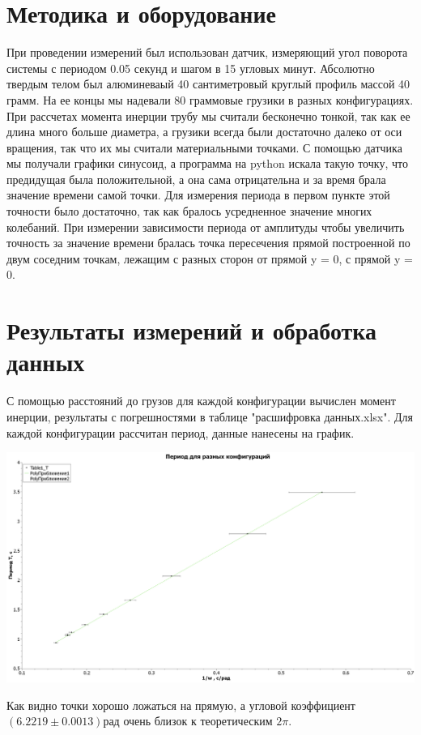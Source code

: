 \documentclass[12pt,a4paper]{scrartcl}
\begin{document}
\section{Методика и оборудование}
	При проведении измерений был использован датчик, измеряющий угол поворота системы с периодом 0.05 секунд и шагом в 15 угловых минут. Абсолютно твердым телом был алюминеваый 40 сантиметровый круглый профиль массой 40 грамм. На ее концы мы надевали 80 граммовые грузики в разных конфигурациях. При рассчетах момента инерции трубу мы считали бесконечно тонкой, так как ее длина много больше диаметра, а грузики всегда были достаточно далеко от оси вращения, так что их мы считали материальными точками. С помощью датчика мы получали графики синусоид, а программа на python искала такую точку, что предидущая была положительной, а она сама отрицательна и за время брала значение времени самой точки. Для измерения периода в первом пункте этой точности было достаточно, так как бралось усредненное значение многих колебаний. При измерении зависимости периода от амплитуды чтобы увеличить точность за значение времени бралась точка пересечения прямой построенной по двум соседним точкам, лежащим с разных сторон от прямой y = 0, с прямой y = 0.  
\section{Результаты измерений и обработка данных}
	С помощью расстояний до грузов для каждой конфигурации вычислен момент инерции, результаты с погрешностями в таблице "расшифровка данных.xlsx". Для каждой конфигурации рассчитан период, данные нанесены на график.
\begin{flushleft}
\includegraphics[scale=0.45]{T(w^-1)}
\end{flushleft}

Как видно точки хорошо ложаться на прямую, а угловой коэффициент $(6.2219\pm0.0013)$рад очень близок к теоретическим $2\pi$.
\end{document}
